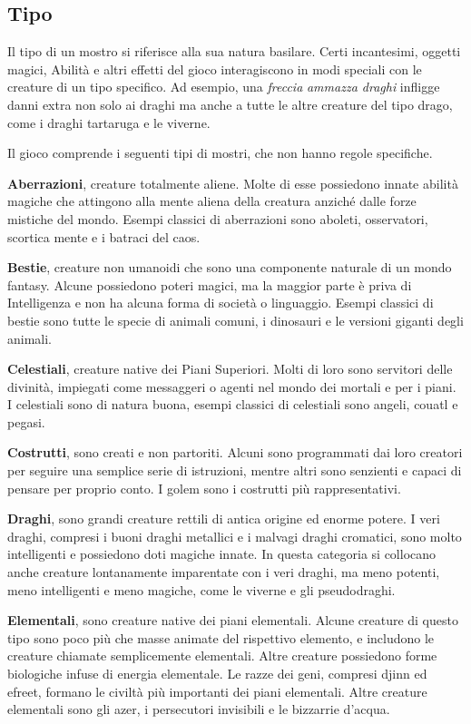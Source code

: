 \subsection{Tipo}

Il tipo di un mostro si riferisce alla sua natura basilare. Certi incantesimi, oggetti magici, Abilità e altri effetti del gioco interagiscono in modi speciali con le creature di un tipo specifico. Ad esempio, una \emph{freccia} \emph{ammazza draghi} infligge danni extra non solo ai draghi ma anche a tutte le altre creature del tipo drago, come i draghi tartaruga e le viverne.

Il gioco comprende i seguenti tipi di mostri, che non hanno regole specifiche.

\medskip\textbf{Aberrazioni}, creature totalmente aliene. Molte di esse possiedono innate abilità magiche che attingono alla mente aliena della creatura anziché dalle forze mistiche del mondo. Esempi classici di aberrazioni sono aboleti, osservatori, scortica mente e i batraci del caos.

\medskip\textbf{Bestie}, creature non umanoidi che sono una componente naturale di un mondo fantasy. Alcune possiedono poteri magici, ma la maggior parte è priva di Intelligenza e non ha alcuna forma di società o linguaggio. Esempi classici di bestie sono tutte le specie di animali comuni, i dinosauri e le versioni giganti degli animali. 

\medskip\textbf{Celestiali}, creature native dei Piani Superiori. Molti di loro sono servitori delle divinità, impiegati come messaggeri o agenti nel mondo dei mortali e per i piani.\\
I celestiali sono di natura buona, esempi classici di celestiali sono angeli, couatl e pegasi.

\medskip\textbf{Costrutti}, sono creati e non partoriti. Alcuni sono programmati dai loro creatori per seguire una semplice serie di istruzioni, mentre altri sono senzienti e capaci di pensare per proprio conto. I golem sono i costrutti più rappresentativi.

\medskip\textbf{Draghi}, sono grandi creature rettili di antica origine ed enorme potere. I veri draghi, compresi i buoni draghi metallici e i malvagi draghi cromatici, sono molto intelligenti e possiedono doti magiche innate. In questa categoria si collocano anche creature lontanamente imparentate con i veri draghi, ma meno potenti, meno intelligenti e meno magiche, come le viverne e gli pseudodraghi.

\medskip\textbf{Elementali}, sono creature native dei piani elementali. Alcune creature di questo tipo sono poco più che masse animate del rispettivo elemento, e includono le creature chiamate semplicemente elementali. Altre creature possiedono forme biologiche infuse di energia elementale. Le razze dei geni, compresi djinn ed efreet, formano le civiltà più importanti dei piani elementali. Altre creature elementali sono gli azer, i persecutori  invisibili e le bizzarrie d'acqua. 

